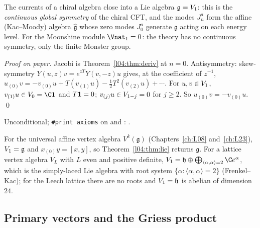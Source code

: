 \begin{physics}
The currents of a chiral algebra close into a Lie algebra $\mathfrak g = V_1$: this is the
\emph{continuous global symmetry} of the chiral CFT, and the modes $J^a_n$ form the affine
(Kac--Moody) algebra $\hat{\mathfrak g}$ whose zero modes $J^a_0$ generate $\mathfrak g$ acting on each
energy level. For the Moonshine module $\Vnat_1 = 0$: the theory has no continuous symmetry, only the
finite Monster group.
\end{physics}
\emph{Proof on paper.} Jacobi is Theorem~\ref{l04:thm:deriv} at $n = 0$. Antisymmetry:
skew-symmetry $Y(u,z)v = e^{zT}Y(v,-z)u$ gives, at the coefficient of $z^{-1}$,
$u_{(0)}v = -v_{(0)}u + T(v_{(1)}u) - \tfrac12T^2(v_{(2)}u)+\cdots$. For $u,v\in V_1$, $v_{(1)}u\in
\lfourV_0 = \C\lfourvac$ and $T\mathbf{1} = 0$; $v_{(j)}u\in V_{1-j} = 0$ for $j\ge2$. So
$u_{(0)}v = -v_{(0)}u$. \qed
\begin{status}
Unconditional; \texttt{\#print axioms} on  and
\allowbreak{}: .
\end{status}

\begin{example}\label{l04:ex:affine}
For the universal affine vertex algebra $V^k(\mathfrak g)$ (Chapters~\ref{ch:L08} and~\ref{ch:L23}),
$V_1 = \mathfrak g$ and $x_{(0)}y = [x,y]$, so Theorem~\ref{l04:thm:lie} returns $\mathfrak g$.
For a lattice vertex algebra $V_L$ with $L$ even and positive definite, $\lfourV_1 = \mathfrak h\oplus
\bigoplus_{\langle\alpha,\alpha\rangle = 2}\C e^\alpha$, which is the simply-laced Lie algebra with root
system $\{\alpha : \langle\alpha,\alpha\rangle = 2\}$ (Frenkel--Kac); for the Leech lattice there
are no roots and $V_1 = \mathfrak h$ is abelian of dimension $24$.
\end{example}

\subsection{Primary vectors and the Griess product}

